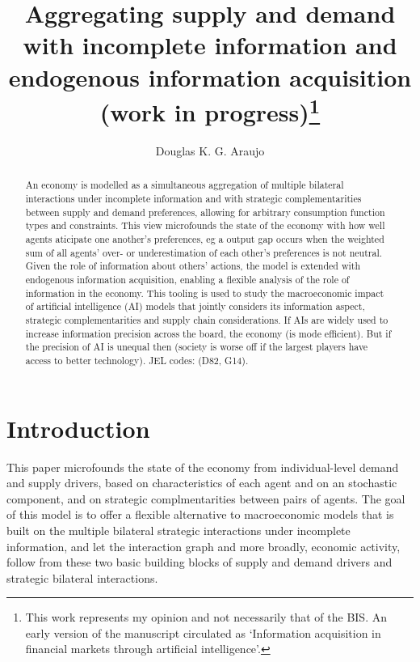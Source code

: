 \documentclass[
]{article}
\title{Aggregating supply and demand with incomplete information and
endogenous information acquisition (work in progress)\thanks{This work
represents my opinion and not necessarily that of the BIS. An early
version of the manuscript circulated as `Information acquisition in
financial markets through artificial intelligence'.}}
\author{Douglas K. G. Araujo}
\affil{%
                  Bank for International
Settlements, douglas.araujo@bis.org
              }
\date{}
\theoremstyle{definition}
\theoremstyle{plain}
\theoremstyle{remark}
\begin{document}
\maketitle
\begin{abstract}
An economy is modelled as a simultaneous aggregation of multiple
bilateral interactions under incomplete information and with strategic
complementarities between supply and demand preferences, allowing for
arbitrary consumption function types and constraints. This view
microfounds the state of the economy with how well agents aticipate one
another's preferences, eg a output gap occurs when the weighted sum of
all agents' over- or underestimation of each other's preferences is not
neutral. Given the role of information about others' actions, the model
is extended with endogenous information acquisition, enabling a flexible
analysis of the role of information in the economy. This tooling is used
to study the macroeconomic impact of artificial intelligence (AI) models
that jointly considers its information aspect, strategic
complementarities and supply chain considerations. If AIs are widely
used to increase information precision across the board, the economy (is
mode efficient). But if the precision of AI is unequal then (society is
worse off if the largest players have access to better technology). JEL
codes: (D82, G14).
\end{abstract}

\section{Introduction}\label{introduction}

This paper microfounds the state of the economy from individual-level
demand and supply drivers, based on characteristics of each agent and on
an stochastic component, and on strategic complmentarities between pairs
of agents. The goal of this model is to offer a flexible alternative to
macroeconomic models that is built on the multiple bilateral strategic
interactions under incomplete information, and let the interaction graph
and more broadly, economic activity, follow from these two basic
building blocks of supply and demand drivers and strategic bilateral
interactions.
\end{document}

